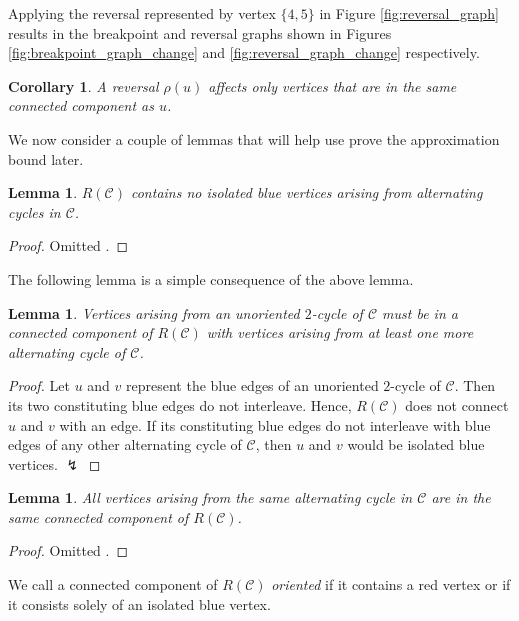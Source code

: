 \documentclass[11pt,DIV=11]{scrartcl}
\def\padding{\vspace{2em}}
\newtheorem{corollary}{Corollary}[theorem]
\newtheorem{lemma}[theorem]{Lemma}
\theoremstyle{definition}
\theoremstyle{remark}
\begin{document}
Applying the reversal represented by vertex $\{4,5\}$ in Figure \ref{fig:reversal_graph} results in the breakpoint and reversal graphs shown in Figures \ref{fig:breakpoint_graph_change} and \ref{fig:reversal_graph_change} respectively.

\begin{corollary}
A reversal $\rho(u)$ affects only vertices that are in the same connected component as $u$.
\end{corollary}\padding

We now consider a couple of lemmas that will help use prove the approximation bound later.

\begin{lemma}
\label{lem:4}
$R(\mathcal{C})$ contains no isolated blue vertices arising from alternating cycles in $\mathcal{C}$.
\end{lemma}

\begin{proof}
Omitted \cite{Christie1998}.
\end{proof}

The following lemma is a simple consequence of the above lemma.

\begin{lemma}
\label{lem:5}
Vertices arising from an unoriented $2$-cycle of $\mathcal{C}$ must be in a connected component of $R(\mathcal{C})$ with vertices arising from at least one more alternating cycle of $\mathcal{C}$.
\end{lemma}

\begin{proof}
Let $u$ and $v$ represent the blue edges of an unoriented $2$-cycle of $\mathcal{C}$. Then its two constituting blue edges do not interleave. Hence, $R(\mathcal{C})$ does not connect $u$ and $v$ with an edge. If its constituting blue edges do not interleave with blue edges of any other alternating cycle of $\mathcal{C}$, then $u$ and $v$ would be isolated blue vertices. $\lightning$
\end{proof}

\begin{lemma}
\label{lem:6}
All vertices arising from the same alternating cycle in $\mathcal{C}$ are in the same connected component of $R(\mathcal{C})$.
\end{lemma}

\begin{proof}
Omitted \cite{Christie1998}.
\end{proof}\padding

We call a connected component of $R(\mathcal{C})$ \textit{oriented} if it contains a red vertex or if it consists solely of an isolated blue vertex.
\end{document}
